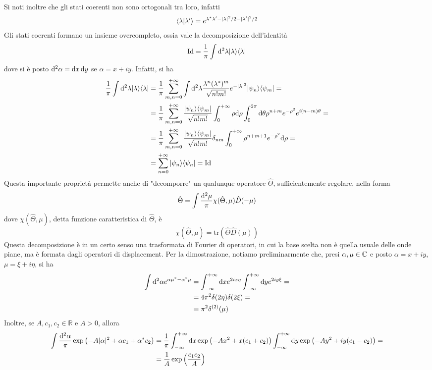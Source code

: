 \documentclass[a4paper, 11pt]{article}
\newcommand{\id}{\mathrm{Id}}
\newcommand{\tr}{\mathrm{tr}}
\renewcommand{\ket}[1]{| #1\rangle}
\renewcommand{\bra}[1]{\langle #1|}
\begin{document}
Si noti inoltre che gli stati coerenti non sono ortogonali tra loro, infatti
\[\langle \lambda\vert\lambda'\rangle=e^{\lambda^*\lambda'-|\lambda|^2/2-|\lambda'|^2/2}\]
Gli stati coerenti formano un insieme overcompleto, ossia vale la decomposizione dell'identità
\[\id=\frac{1}{\pi}\int \d^2\lambda\ket\lambda\bra\lambda\]
dove si è posto $\mathrm{d} ^2\alpha=\mathrm{d} x\,\mathrm{d} y$ se $\alpha=x+iy$. Infatti, si ha
\begin{align*}
	\frac{1}{\pi}\int \d^2\lambda\ket\lambda\bra\lambda&=\frac{1}{\pi}\sum_{m,n=0}^{+\infty}\int \d ^2\lambda\frac{\lambda^n(\lambda^*)^m}{\sqrt{n!m!}}e^{-|\lambda|^2}\ket{\psi_n}\bra{\psi_m}=\\&=\frac{1}{\pi}\sum_{m,n=0}^{+\infty}\frac{\ket{\psi_n}\bra{\psi_m}}{\sqrt{n!m!}}\int_{0}^{+\infty}\rho \d \rho \int_{0}^{2\pi}\d \theta\rho^{n+m}e^{-\rho^2}e^{i(n-m)\theta}=\\&=\frac{1}{\pi}\sum_{m,n=0}^{+\infty}\frac{\ket{\psi_n}\bra{\psi_m}}{\sqrt{n!m!}}\delta_{nm}\int_{0}^{+\infty}\rho^{n+m+1}e^{-\rho^2}\d \rho=\\&=\sum_{n=0}^{+\infty}\ket{\psi_n}\bra{\psi_n}=\id
\end{align*}
Questa importante proprietà permette anche di "decomporre" un qualunque operatore $\hat{\Theta}$, sufficientemente regolare, nella forma
\[\hat{\Theta}=\int\frac{\mathrm{d} ^2\mu}{\pi}\chi(\hat{\Theta},\mu)\hat D(-\mu)\]
dove $\chi(\hat{\Theta},\mu)$, detta funzione caratteristica di $\hat{\Theta}$, è
\[\chi(\hat{\Theta},\mu)=\tr\left(\hat{\Theta}\hat{D}(\mu)\right)\]
Questa decomposizione è in un certo senso una trasformata di Fourier di operatori, in cui la base scelta non è quella usuale delle onde piane, ma è formata dagli operatori di displacement. Per la dimostrazione, notiamo preliminarmente che, presi $\alpha,\mu\in\mathbb{C}$ e posto $\alpha=x+iy$, $\mu=\xi+i\eta$, si ha
\begin{align*}
	\int\mathrm{d} ^2\alpha e^{\alpha\mu^*-\alpha^*\mu}&=\int_{-\infty}^{+\infty} \mathrm{d} x e^{2ix\eta }\int_{-\infty}^{+\infty}\mathrm{d} ye^{2iy\xi}=\\&=4\pi^2\delta(2\eta)\delta(2\xi)=\\&=\pi^2\delta^{(2)}(\mu)
\end{align*}
Inoltre, se $A,c_1,c_2\in\mathbb{R}$ e $A>0$, allora
\begin{align*}
	\int\frac{\mathrm{d} ^2\alpha}{\pi}\exp\left(-A|\alpha|^2+\alpha c_1+\alpha^*c_2\right)&=\frac{1}{\pi}\int_{-\infty}^{+\infty}\mathrm{d} x\exp\left(-Ax^2+x(c_1+c_2)\right)\int_{-\infty}^{+\infty}\mathrm{d} y\exp\left(-Ay^2+iy(c_1-c_2)\right)=\\&=\frac{1}{A}\exp\left(\frac{c_1c_2}{A}\right)
\end{align*}
\end{document}
